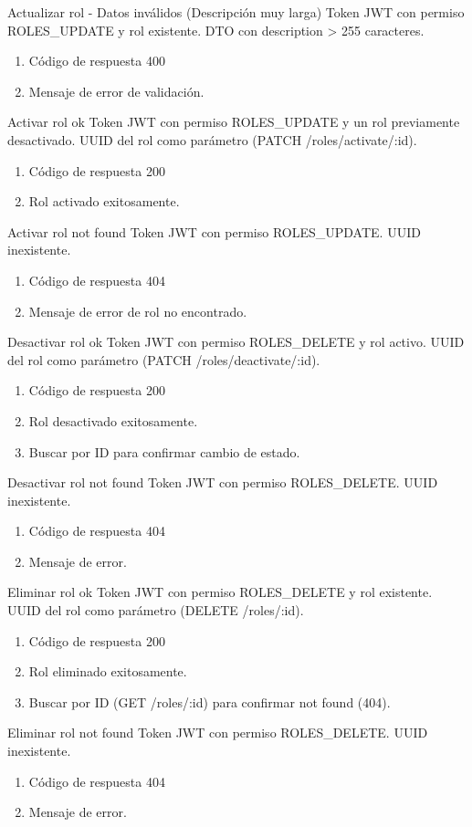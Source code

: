 {Actualizar rol - Datos inválidos (Descripción muy larga)}
{Token JWT con permiso ROLES\_UPDATE y rol existente.}
{DTO con description > 255 caracteres.}
{\begin{enumerate} [leftmargin=*, nosep]
    \item Código de respuesta 400
    \item Mensaje de error de validación.
\end{enumerate}}

{Activar rol ok}
{Token JWT con permiso ROLES\_UPDATE y un rol previamente desactivado.}
{UUID del rol como parámetro (PATCH /roles/activate/:id).}
{\begin{enumerate} [leftmargin=*, nosep]
    \item Código de respuesta 200
    \item Rol activado exitosamente.
\end{enumerate}}

{Activar rol not found}
{Token JWT con permiso ROLES\_UPDATE.}
{UUID inexistente.}
{\begin{enumerate} [leftmargin=*, nosep]
    \item Código de respuesta 404
    \item Mensaje de error de rol no encontrado.
\end{enumerate}}

{Desactivar rol ok}
{Token JWT con permiso ROLES\_DELETE y rol activo.}
{UUID del rol como parámetro (PATCH /roles/deactivate/:id).}
{\begin{enumerate} [leftmargin=*, nosep]
    \item Código de respuesta 200
    \item Rol desactivado exitosamente.
    \item Buscar por ID para confirmar cambio de estado.
\end{enumerate}}

{Desactivar rol not found}
{Token JWT con permiso ROLES\_DELETE.}
{UUID inexistente.}
{\begin{enumerate} [leftmargin=*, nosep]
    \item Código de respuesta 404
    \item Mensaje de error.
\end{enumerate}}

{Eliminar rol ok}
{Token JWT con permiso ROLES\_DELETE y rol existente.}
{UUID del rol como parámetro (DELETE /roles/:id).}
{\begin{enumerate} [leftmargin=*, nosep]
    \item Código de respuesta 200
    \item Rol eliminado exitosamente.
    \item Buscar por ID (GET /roles/:id) para confirmar not found (404).
\end{enumerate}}

{Eliminar rol not found}
{Token JWT con permiso ROLES\_DELETE.}
{UUID inexistente.}
{\begin{enumerate} [leftmargin=*, nosep]
    \item Código de respuesta 404
    \item Mensaje de error.
\end{enumerate}}

